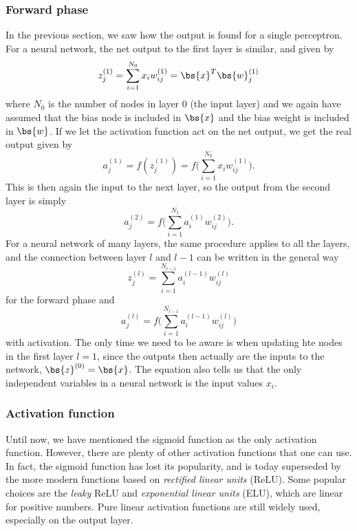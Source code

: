 \subsubsection{Forward phase}
In the previous section, we saw how the output is found for a single perceptron. For a neural network, the net output to the first layer is similar, and given by
\begin{equation}
z_j^{(1)}=\sum_{i=1}^{N_0}x_iw_{ij}^{(1)}=\bs{x}^T\bs{w}_j^{(1)}
\end{equation}
where $N_0$ is the number of nodes in layer 0 (the input layer) and we again have assumed that the bias node is included in $\bs{x}$ and the bias weight is included in $\bs{w}$. If we let the activation function act on the net output, we get the real output given by
\begin{equation}
a_j^{(1)}=f(z_j^{(1)})=f\Big(\sum_{i=1}^{N_0}x_iw_{ij}^{(1)}\Big).
\end{equation}
This is then again the input to the next layer, so the output from the second layer is simply
\begin{equation}
a_j^{(2)}=f\big(\sum_{i=1}^{N_1}a_i^{(1)}w_{ij}^{(2)}\big).
\end{equation}
For a neural network of many layers, the same procedure applies to all the layers, and the connection between layer $l$ and $l-1$ can be written in the general way
\begin{equation}
z_j^{(l)}=\sum_{i=1}^{N_{l-1}}a_i^{(l-1)}w_{ij}^{(l)}
\end{equation}
for the forward phase and
\begin{equation}
a_j^{(l)}=f\big(\sum_{i=1}^{N_{l-1}}a_i^{(l-1)}w_{ij}^{(l)}\big)
\end{equation}
with activation. The only time we need to be aware is when updating hte nodes in the first layer $l=1$, since the outputs then actually are the inputs to the network, $\bs{z}^{(0)}=\bs{x}$. The equation also tells us that the only independent variables in a neural network is the input values $x_i$.

\subsubsection{Activation function}
Until now, we have mentioned the sigmoid function as the only activation function. However, there are plenty of other activation functions that one can use. In fact, the sigmoid function has lost its popularity, and is today superseded by the more modern functions based on \textit{rectified linear units} (ReLU). Some popular choices are the \textit{leaky} ReLU and \textit{exponential linear units} (ELU), which are linear for positive numbers. Pure linear activation functions are still widely used, especially on the output layer. 

